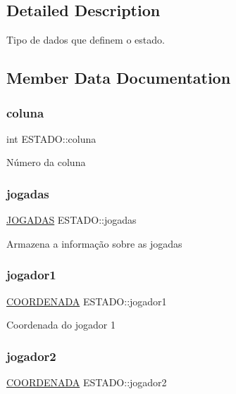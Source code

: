 \subsection{Detailed Description}
Tipo de dados que definem o estado. 

\subsection{Member Data Documentation}
\mbox{\label{structESTADO_a1ebc28eba173a8182dfbd568ed2eab4b}} 
\subsubsection{\texorpdfstring{coluna}{coluna}}
{\footnotesize\ttfamily int E\+S\+T\+A\+D\+O\+::coluna}

Número da coluna \mbox{\label{structESTADO_afae43b87a488fad0f2b56a18bad31d18}} 
\subsubsection{\texorpdfstring{jogadas}{jogadas}}
{\footnotesize\ttfamily \hyperlink{camada__de__dados_8h_a94c221d29a1760f008b7834093259b7d}{J\+O\+G\+A\+D\+AS} E\+S\+T\+A\+D\+O\+::jogadas}

Armazena a informação sobre as jogadas \mbox{\label{structESTADO_a18e430d344b0af279061c0ef8273ea59}} 
\subsubsection{\texorpdfstring{jogador1}{jogador1}}
{\footnotesize\ttfamily \hyperlink{structCOORDENADA}{C\+O\+O\+R\+D\+E\+N\+A\+DA} E\+S\+T\+A\+D\+O\+::jogador1}

Coordenada do jogador 1 \mbox{\label{structESTADO_a4fe7d0098c4e4ba7db1998fbc2be7e9f}} 
\subsubsection{\texorpdfstring{jogador2}{jogador2}}
{\footnotesize\ttfamily \hyperlink{structCOORDENADA}{C\+O\+O\+R\+D\+E\+N\+A\+DA} E\+S\+T\+A\+D\+O\+::jogador2}

